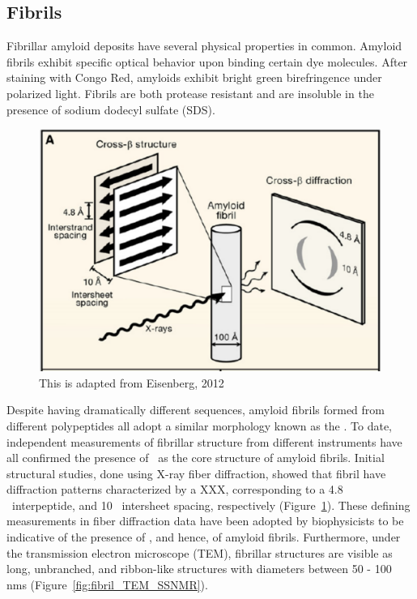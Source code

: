 \subsection{Fibrils}

Fibrillar amyloid deposits have several physical properties in common. Amyloid fibrils exhibit specific optical behavior upon binding certain dye molecules. After staining with Congo Red, amyloids exhibit bright green birefringence under polarized light. Fibrils are both protease resistant and are insoluble in the presence of sodium dodecyl sulfate (SDS).  

\begin{figure}
  \centering
  \includegraphics[width=6in]{figures/introduction/fibril_structure_diffraction.pdf}
  \caption[Characteristic cross-$\beta$ spacings from X-ray fibre diffraction studies of amyloid fibrils]{This is adapted from Eisenberg, 2012}
  \label{fig:fibril_diffraction}
\end{figure}

Despite having dramatically different sequences, amyloid fibrils formed from different polypeptides all adopt a similar morphology known as the \crossbs.  To date, independent measurements of fibrillar structure from different instruments have all confirmed the presence of \crossbs\ as the core structure of amyloid fibrils. Initial structural studies, done using X-ray fiber diffraction, showed that fibril have diffraction patterns characterized by a XXX, corresponding to a 4.8 \angstrom\ interpeptide, and 10 \angstrom\ intersheet spacing, respectively (Figure~\ref{fig:fibril_diffraction}).  These defining measurements in fiber diffraction data have been adopted by biophysicists to be indicative of the presence of \crossbs, and hence, of amyloid fibrils. Furthermore, under the transmission electron microscope (TEM), fibrillar structures are visible as long, unbranched, and ribbon-like structures with diameters between 50 - 100 nms (Figure~\ref{fig:fibril_TEM_SSNMR}). 

